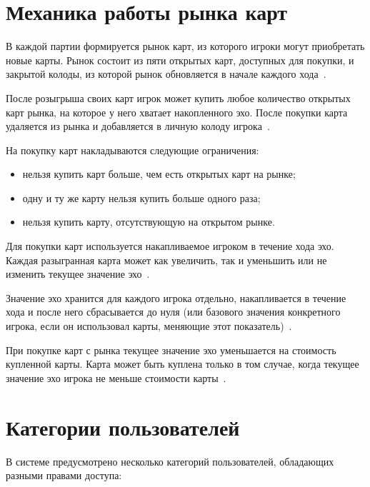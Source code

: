 \section{Механика работы рынка карт}

В каждой партии формируется рынок карт, из которого игроки могут приобретать
новые карты. Рынок состоит из пяти открытых карт, доступных для покупки, и
закрытой колоды, из которой рынок обновляется в начале каждого
хода~\cite{rules}.

После розыгрыша своих карт игрок может купить любое количество открытых карт
рынка, на которое у него хватает накопленного эхо. После покупки карта
удаляется из рынка и добавляется в личную колоду игрока~\cite{rules}.

На покупку карт накладываются следующие ограничения:
\begin{itemize}
	\item нельзя купить карт больше, чем есть открытых карт на рынке;
	\item одну и ту же карту нельзя купить больше одного раза;
	\item нельзя купить карту, отсутствующую на открытом рынке.
\end{itemize}

Для покупки карт используется накапливаемое игроком в течение хода эхо. Каждая
разыгранная карта может как увеличить, так и уменьшить или не изменить текущее
значение эхо~\cite{rules}.

Значение эхо хранится для каждого игрока отдельно, накапливается в течение хода
и после него сбрасывается до нуля (или базового значения конкретного игрока,
если он использовал карты, меняющие этот показатель)~\cite{rules}.

При покупке карт с рынка текущее значение эхо уменьшается на стоимость
купленной карты. Карта может быть куплена только в том случае, когда текущее
значение эхо игрока не меньше стоимости карты~\cite{rules}.

\section{Категории пользователей}
В системе предусмотрено несколько категорий пользователей, обладающих разными
правами доступа:

